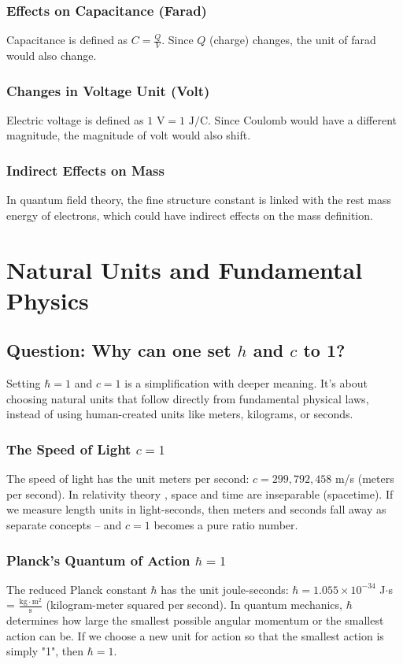 \documentclass[12pt,a4paper]{article}
\begin{document}
	\subsubsection{Effects on Capacitance (Farad)}
	Capacitance is defined as $C = \frac{Q}{V}$. Since $Q$ (charge) changes, the unit of farad would also change.
	
	\subsubsection{Changes in Voltage Unit (Volt)}
	Electric voltage is defined as $1 \text{ V} = 1 \text{ J}/\text{C}$. Since Coulomb would have a different magnitude, the magnitude of volt would also shift.
	
	\subsubsection{Indirect Effects on Mass}
	In quantum field theory, the fine structure constant is linked with the rest mass energy of electrons, which could have indirect effects on the mass definition.
	
	\section{Natural Units and Fundamental Physics}
	
	\subsection{Question: Why can one set $h$ and $c$ to 1?}
	
	Setting $\hbar = 1$ and $c = 1$ is a simplification with deeper meaning. It's about choosing natural units that follow directly from fundamental physical laws, instead of using human-created units like meters, kilograms, or seconds.
	
	\subsubsection{The Speed of Light $c = 1$}
	The speed of light has the unit meters per second: $c = 299,792,458$ m/s (meters per second). In relativity theory \cite{Einstein1905}, space and time are inseparable (spacetime). If we measure length units in light-seconds, then meters and seconds fall away as separate concepts – and $c = 1$ becomes a pure ratio number.
	
	\subsubsection{Planck's Quantum of Action $\hbar = 1$}
	The reduced Planck constant $\hbar$ has the unit joule-seconds: $\hbar = 1.055 \times 10^{-34}$ J$\cdot$s = $\frac{\text{kg} \cdot \text{m}^2}{\text{s}}$ (kilogram-meter squared per second). In quantum mechanics, $\hbar$ determines how large the smallest possible angular momentum or the smallest action can be. If we choose a new unit for action so that the smallest action is simply "1", then $\hbar = 1$.
	
\end{document}
